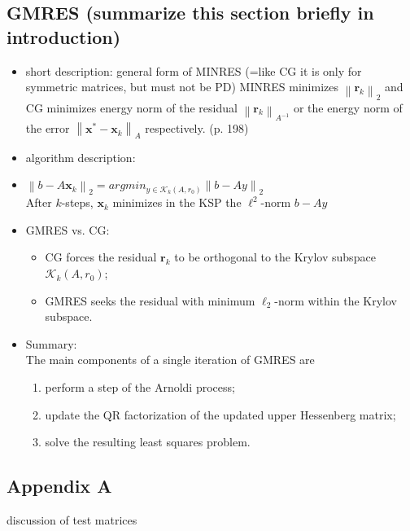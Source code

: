 \documentclass{scrartcl}
\newcommand{\norm}[1]{\left\lVert#1\right\rVert}
\begin{document}
\subsection*{GMRES (summarize this section briefly in introduction)}
\begin{itemize}
\item short description: general form of MINRES (=like CG it is only for symmetric matrices, but must not be PD) MINRES minimizes $\norm{\textbf{r}_k}_2$ and CG minimizes energy norm of the residual $\norm{\textbf{r}_k}_{A^{-1}}$ or the energy norm of the error $\norm{\textbf{x}^* - \textbf{x}_k}_A$ respectively. \cite{Ascher:2011:FCN:2031413} (p. 198)
\item algorithm description:
\item $\norm{b - A\textbf{x}_k}_2 = argmin_{y \in \mathcal{K}_k(A, r_0)}\norm{b - Ay}_2$\\
	 After $k$-steps, $\textbf{x}_k$ minimizes in the KSP the $\ell^2$-norm $b - Ay$
\item GMRES vs. CG:
\begin{itemize}
\item CG forces the residual $\textbf{r}_k$ to be orthogonal to the Krylov subspace $\mathcal{K}_k(A, r_0)$;
\item GMRES seeks the residual with minimum $\ell_2$-norm within the Krylov subspace.
\end{itemize}
\item Summary:\\
The main components of a single iteration of GMRES are
\begin{enumerate}
	\item perform a step of the Arnoldi process;
	\item update the QR factorization of the updated upper Hessenberg matrix;
	\item solve the resulting least squares problem.
	\end{enumerate}
\end{itemize}



 \listofalgorithms
\begin{appendices}
\section*{Appendix A}
discussion of test matrices
\end{appendices}
\end{document}
